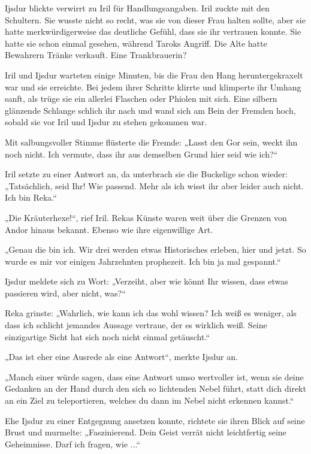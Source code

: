 Ijsdur blickte verwirrt zu Iril für Handlungsangaben. Iril zuckte mit den Schultern. Sie wusste nicht so recht, was sie von dieser Frau halten sollte, aber sie hatte merkwürdigerweise das deutliche Gefühl, dass sie ihr vertrauen konnte. Sie hatte sie schon einmal gesehen, während Taroks Angriff. Die Alte hatte Bewahrern Tränke verkauft. Eine Trankbrauerin?

Iril und Ijsdur warteten einige Minuten, bis die Frau den Hang heruntergekraxelt war und sie erreichte. Bei jedem ihrer Schritte klirrte und klimperte ihr Umhang sanft, als trüge sie ein allerlei Flaschen oder Phiolen mit sich. Eine silbern glänzende Schlange schlich ihr nach und wand sich am Bein der Fremden hoch, sobald sie vor Iril und Ijsdur zu stehen gekommen war.

Mit salbungsvoller Stimme flüsterte die Fremde: „Lasst den Gor sein, weckt ihn noch nicht. Ich vermute, dass ihr aus demselben Grund hier seid wie ich?“

Iril setzte zu einer Antwort an, da unterbrach sie die Buckelige schon wieder: „Tatsächlich, seid Ihr! Wie passend. Mehr als ich wisst ihr aber leider auch nicht. Ich bin Reka.“

„Die Kräuterhexe!“, rief Iril. Rekas Künste waren weit über die Grenzen von Andor hinaus bekannt. Ebenso wie ihre eigenwillige Art.

„Genau die bin ich. Wir drei werden etwas Historisches erleben, hier und jetzt. So wurde es mir vor einigen Jahrzehnten prophezeit. Ich bin ja mal gespannt.“

Ijsdur meldete sich zu Wort: „Verzeiht, aber wie könnt Ihr wissen, dass etwas passieren wird, aber nicht, was?“

Reka grinste: „Wahrlich, wie kann ich das wohl wissen? Ich weiß es weniger, als dass ich schlicht jemandes Aussage vertraue, der es wirklich weiß. Seine einzigartige Sicht hat sich noch nicht einmal getäuscht.“

„Das ist eher eine Ausrede als eine Antwort“, merkte Ijsdur an.

„Manch einer würde sagen, dass eine Antwort umso wertvoller ist, wenn sie deine Gedanken an der Hand durch den sich so lichtenden Nebel führt, statt dich direkt an ein Ziel zu teleportieren, welches du dann im Nebel nicht erkennen kannst.“

Ehe Ijsdur zu einer Entgegnung ansetzen konnte, richtete sie ihren Blick auf seine Brust und murmelte: „Faszinierend. Dein Geist verrät nicht leichtfertig seine Geheimnisse. Darf ich fragen, wie ...“

